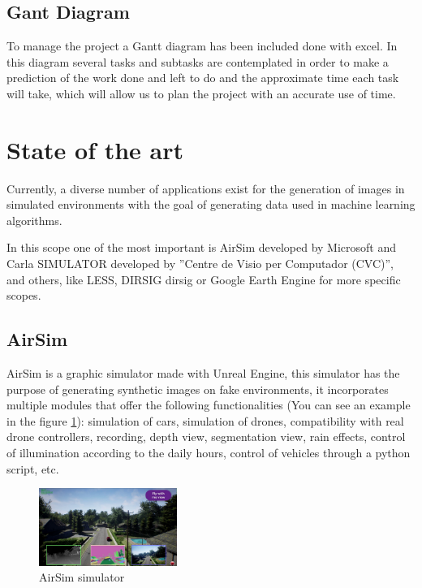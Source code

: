 \documentclass[10pt,a4paper,twocolumn,twoside]{article}
\begin{document}
\subsection{Gant Diagram}

To manage the project a Gantt diagram has been included done with excel. In this diagram several tasks and subtasks are contemplated in order to make a prediction of the work done and left to do and the approximate time each task will take, which will allow us to plan the project with an accurate use of time.

\section{State of the art}
\label{estatart}

Currently, a diverse number of applications exist for the generation of images in simulated environments with the goal of generating data used in machine learning algorithms.

In this scope one of the most important is AirSim\cite{airsim} developed by Microsoft and Carla SIMULATOR\cite{carla} developed by ''Centre de Visio per Computador (CVC)'', and others, like LESS\cite{less}, DIRSIG {dirsig} or Google Earth Engine\cite{googleearth} for more specific scopes.

\subsection{AirSim}
AirSim is a graphic simulator made with Unreal Engine, this simulator has the purpose of generating synthetic images on fake environments, it incorporates multiple modules that offer the following functionalities (You can see an example in the figure \ref{fig-airsim}): simulation of cars, simulation of drones, compatibility with real drone controllers, recording, depth view, segmentation view, rain effects, control of illumination according to the daily hours, control of vehicles through a python script, etc.

\begin{figure}[!h]
\centering
  	\includegraphics[width=0.4\textwidth]{airsim}
	\caption{AirSim simulator}
	\label{fig-airsim}
\end{figure}
\end{document}
